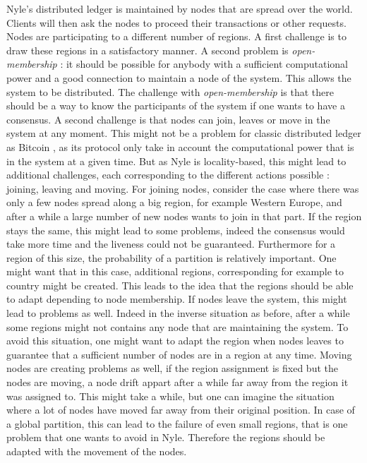 \documentclass[a4paper,11pt,oneside]{report}
\begin{document}
Nyle's distributed ledger is maintained by nodes that are spread over the world.
Clients will then ask the nodes to proceed their transactions or other
requests. Nodes are participating to a different number of regions. A first
challenge is to draw these regions in a satisfactory manner. A second problem
is \textit{open-membership} : it should be possible for anybody with a
sufficient computational power and a good connection to maintain a node of the
system. This allows the system to be distributed. The challenge with
\textit{open-membership} is that there should be a way to know the participants
of the system if one wants to have a consensus.   A second challenge is that
nodes can join, leaves or move in the system at any moment. This might not be a
problem for classic distributed ledger as Bitcoin \cite{Nakamoto2009}, as its
protocol only take in account the computational power that is in the system at
a given time. But as Nyle is locality-based, this might lead to additional
challenges, each corresponding to the different actions possible : joining,
leaving and moving. For joining nodes, consider the case where there was only a
few nodes spread along a big region, for example Western Europe, and after a
while a large number of new nodes wants to join in that part. If the region
stays the same, this might lead to some problems, indeed the consensus would
take more time and the liveness could not be guaranteed. Furthermore for a
region of this size, the probability of a partition is relatively important.
One might want that in this case, additional regions, corresponding for example
to country might be created. This leads to the idea that the regions should be
able to adapt depending to node membership.  If nodes leave the system, this
might lead to problems as well. Indeed in the inverse situation as before,
after a while some regions might not contains any node that are maintaining the
system. To avoid this situation, one might want to adapt the region when nodes
leaves to guarantee that a sufficient number of nodes are in a region at any
time. Moving nodes are creating problems as well, if the region assignment is
fixed but the nodes are moving, a node drift appart after a while far away from
the region it was assigned to. This might take a while, but one can imagine the
situation where a lot of nodes have moved far away from their original
position. In case of a global partition, this can lead to the failure of even
small regions, that is one problem that one wants to avoid in Nyle. Therefore
the regions should be adapted with the movement of the nodes. 
\end{document}
